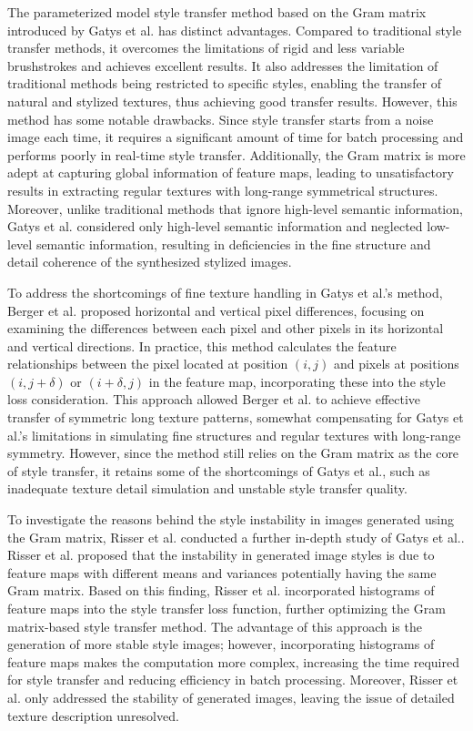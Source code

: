\documentclass[preprint,12pt]{elsarticle}
\begin{document}
The parameterized model style transfer method based on the Gram matrix introduced by Gatys et al. has distinct advantages\citep{02gatys2016image}. Compared to traditional style transfer methods, it overcomes the limitations of rigid and less variable brushstrokes and achieves excellent results. It also addresses the limitation of traditional methods being restricted to specific styles, enabling the transfer of natural and stylized textures\citep{01jing2019neural}, thus achieving good transfer results. However, this method has some notable drawbacks. Since style transfer starts from a noise image each time, it requires a significant amount of time for batch processing and performs poorly in real-time style transfer. Additionally, the Gram matrix is more adept at capturing global information of feature maps, leading to unsatisfactory results in extracting regular textures with long-range symmetrical structures\citep{01jing2019neural}. Moreover, unlike traditional methods that ignore high-level semantic information, Gatys et al.\citep{02gatys2016image} considered only high-level semantic information and neglected low-level semantic information, resulting in deficiencies in the fine structure and detail coherence of the synthesized stylized images.

To address the shortcomings of fine texture handling in Gatys et al.'s method, Berger et al.\citep{26berger2016incorporating} proposed horizontal and vertical pixel differences, focusing on examining the differences between each pixel and other pixels in its horizontal and vertical directions. In practice, this method calculates the feature relationships between the pixel located at position $(i, j)$ and pixels at positions $(i,j+\delta)$ or $(i+\delta,j)$ in the feature map, incorporating these into the style loss consideration. This approach allowed Berger et al.\citep{26berger2016incorporating} to achieve effective transfer of symmetric long texture patterns, somewhat compensating for Gatys et al.'s limitations in simulating fine structures and regular textures with long-range symmetry. However, since the method still relies on the Gram matrix as the core of style transfer, it retains some of the shortcomings of Gatys et al., such as inadequate texture detail simulation and unstable style transfer quality.

To investigate the reasons behind the style instability in images generated using the Gram matrix, Risser et al.\citep{27risser2017stable} conducted a further in-depth study of Gatys et al.\citep{02gatys2016image}. Risser et al. proposed that the instability in generated image styles is due to feature maps with different means and variances potentially having the same Gram matrix. Based on this finding, Risser et al. incorporated histograms of feature maps into the style transfer loss function, further optimizing the Gram matrix-based style transfer method. The advantage of this approach is the generation of more stable style images; however, incorporating histograms of feature maps makes the computation more complex, increasing the time required for style transfer and reducing efficiency in batch processing. Moreover, Risser et al. only addressed the stability of generated images, leaving the issue of detailed texture description unresolved.
\end{document}
